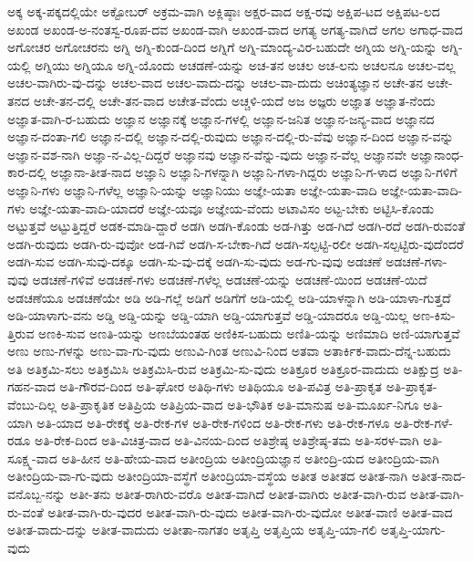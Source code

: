 {ಅಕ್ಕ
ಅಕ್ಕ-ಪಕ್ಕದಲ್ಲಿಯೇ
ಅಕ್ಟೋಬರ್
ಅಕ್ರಮ-ವಾಗಿ
ಅಕ್ಲಿಷ್ಠಾಃ
ಅಕ್ಷರ-ವಾದ
ಅಕ್ಷ-ರವು
ಅಕ್ಷಿಪ-ಟದ
ಅಕ್ಷಿಪಟ-ಲದ
ಅಖಂಡ
ಅಖಂಡ-ಅ-ನಂತಸ್ವ-ರೂಪ-ದವ
ಅಖಂಡ-ವಾಗಿ
ಅಖಂಡ-ವಾದ
ಅಗತ್ಯ
ಅಗತ್ಯ-ವಾಗಿದೆ
ಅಗಲ
ಅಗಾಧ-ವಾದ
ಅಗೋಚರ
ಅಗೋಚರನು
ಅಗ್ನಿ
ಅಗ್ನಿ-ಕುಂಡ-ದಿಂದ
ಅಗ್ನಿಗೆ
ಅಗ್ನಿ-ಮಾಂದ್ಯ-ವಿರ-ಬಹುದೇ
ಅಗ್ನಿಯ
ಅಗ್ನಿ-ಯನ್ನು
ಅಗ್ನಿ-ಯಲ್ಲಿ
ಅಗ್ನಿಯು
ಅಗ್ನಿಯೂ
ಅಗ್ನಿ-ಯೊಂದು
ಅಚಡಣೆ-ಯನ್ನು
ಅಚ-ತನ
ಅಚಲ
ಅಚ-ಲನು
ಅಚಲನೂ
ಅಚಲ-ವಲ್ಲ
ಅಚಲ-ವಾಗಿರು-ವು-ದನ್ನು
ಅಚಲ-ವಾದ
ಅಚಲ-ವಾದು-ದನ್ನು
ಅಚಲ-ವಾ-ದುದು
ಅಚಿಂತ್ಯಜ್ಞಾನ
ಅಚೇ-ತನ
ಅಚೇ-ತನದ
ಅಚೇ-ತನ-ದಲ್ಲಿ
ಅಚೇ-ತನ-ವಾದ
ಅಚೇತ-ವೆಂದು
ಅಚ್ಚಳಿ-ಯದೆ
ಅಜ
ಅಜ್ಞರು
ಅಜ್ಞಾತ
ಅಜ್ಞಾತ-ನೆಂದು
ಅಜ್ಞಾತ-ವಾಗಿ-ರ-ಬಹುದು
ಅಜ್ಞಾನ
ಅಜ್ಞಾನಕ್ಕೆ
ಅಜ್ಞಾನ-ಗಳಲ್ಲಿ
ಅಜ್ಞಾನ-ಜನಿತ
ಅಜ್ಞಾನ-ಜನ್ಯ-ವಾದ
ಅಜ್ಞಾನದ
ಅಜ್ಞಾನ-ದಂತಾ-ಗಲಿ
ಅಜ್ಞಾನ-ದಲ್ಲಿ
ಅಜ್ಞಾನ-ದಲ್ಲಿ-ರುವುದು
ಅಜ್ಞಾನ-ದಲ್ಲಿ-ರು-ವೆವು
ಅಜ್ಞಾನ-ದಿಂದ
ಅಜ್ಞಾನ-ವನ್ನು
ಅಜ್ಞಾನ-ವಶ-ನಾಗಿ
ಅಜ್ಞಾ-ನ-ವಿಲ್ಲ-ದಿದ್ದರೆ
ಅಜ್ಞಾನವು
ಅಜ್ಞಾನ-ವೆನ್ನು-ವುದು
ಅಜ್ಞಾನ-ವೆಲ್ಲ
ಅಜ್ಞಾನವೇ
ಅಜ್ಞಾನಾಂಧ-ಕಾರ-ದಲ್ಲಿ
ಅಜ್ಞಾನಾ-ತೀತ-ನಾದ
ಅಜ್ಞಾನಿ
ಅಜ್ಞಾನಿ-ಗಳನ್ನಾಗಿ
ಅಜ್ಞಾನಿ-ಗಳಾ-ಗಿದ್ದರು
ಅಜ್ಞಾನಿ-ಗ-ಳಾದ
ಅಜ್ಞಾನಿ-ಗಳಿಗೆ
ಅಜ್ಞಾನಿ-ಗಳು
ಅಜ್ಞಾನಿ-ಗಳೆಲ್ಲ
ಅಜ್ಞಾನಿ-ಯನ್ನು
ಅಜ್ಞಾನಿಯು
ಅಜ್ಞೇ-ಯತಾ
ಅಜ್ಞೇ-ಯತಾ-ವಾದಿ
ಅಜ್ಞೇ-ಯತಾ-ವಾದಿ-ಗಳು
ಅಜ್ಞೇ-ಯತಾ-ವಾದಿ-ಯಾದರೆ
ಅಜ್ಞೇ-ಯವೂ
ಅಜ್ಞೇಯ-ವೆಂದು
ಅಟಾವಿಸಂ
ಅಟ್ಟ-ಬೇಕು
ಅಟ್ಟಿಸಿ-ಕೊಂಡು
ಅಟ್ಟುತ್ತವೆ
ಅಟ್ಟುತ್ತಿದ್ದರೆ
ಅಡಕ-ಮಾಡಿ-ದ್ದಾರೆ
ಅಡಗಿ
ಅಡಗಿ-ಕೊಂಡು
ಅಡ-ಗಿತ್ತು
ಅಡ-ಗಿದೆ
ಅಡಗಿ-ರದೆ
ಅಡಗಿ-ರುವಂತೆ
ಅಡಗಿ-ರುವುದು
ಅಡಗಿ-ರು-ವುವೋ
ಅಡ-ಗಿವೆ
ಅಡಗಿ-ಸ-ಬೇಕಾ-ಗಿದೆ
ಅಡಗಿ-ಸಲ್ಪಟ್ಟಿ-ರಲೀ
ಅಡಗಿ-ಸಲ್ಪಟ್ಟಿರು-ವುದೆಂದರೆ
ಅಡಗಿ-ಸುವ
ಅಡಗಿ-ಸುವು-ದಕ್ಕೂ
ಅಡಗಿ-ಸು-ವು-ದಕ್ಕೆ
ಅಡಗಿ-ಸು-ವುದು
ಅಡ-ಗು-ವುವು
ಅಡಚಣೆ
ಅಡಚಣೆ-ಗಳಾ-ವುವು
ಅಡಚಣೆ-ಗಳಿವೆ
ಅಡಚಣೆ-ಗಳು
ಅಡಚಣೆ-ಗಳೆಲ್ಲ
ಅಡಚಣೆ-ಯನ್ನು
ಅಡಚಣೆ-ಯಿಂದ
ಅಡಚಣೆ-ಯಿದೆ
ಅಡಚಣೆಯೂ
ಅಡಚಣೆಯೇ
ಅಡಿ
ಅಡಿ-ಗಲ್ಲೆ
ಅಡಿಗೆ
ಅಡಿಗೆಗೆ
ಅಡಿ-ಯಲ್ಲಿ
ಅಡಿ-ಯಾಳನ್ನಾಗಿ
ಅಡಿ-ಯಾಳಾ-ಗುತ್ತದೆ
ಅಡಿ-ಯಾಳಾಗು-ವನು
ಅಡ್ಡಿ
ಅಡ್ಡಿ-ಯನ್ನು
ಅಡ್ಡಿ-ಯಾಗಿ
ಅಡ್ಡಿ-ಯಾಗುತ್ತವೆ
ಅಡ್ಡಿ-ಯಾದರೂ
ಅಡ್ಡಿ-ಯಿಲ್ಲ
ಅಣ-ಕಿಸು-ತ್ತಿರುವ
ಅಣಕಿ-ಸುವ
ಅಣತಿ-ಯನ್ನು
ಅಣಬೆಯಂತಹ
ಅಣಿಕಿಸ-ಬಹುದು
ಅಣಿತಿ-ಯನ್ನು
ಅಣಿಮಾದಿ
ಅಣಿ-ಯಾಗುತ್ತವೆ
ಅಣು
ಅಣು-ಗಳನ್ನು
ಅಣು-ವಾ-ಗು-ವುದು
ಅಣುವಿ-ಗಿಂತ
ಅಣುವಿ-ನಿಂದ
ಅತವಾ
ಅತಾರ್ಕಿಕ-ವಾದು-ದೆನ್ನ-ಬಹುದು
ಅತಿ
ಅತಿಕ್ರಮಿ-ಸಲು
ಅತಿಕ್ರಮಿಸಿ
ಅತಿಕ್ರಮಿಸಿ-ರುವ
ಅತಿಕ್ರಮಿ-ಸು-ವುದು
ಅತಿಕ್ರೂರ
ಅತಿಕ್ರೂರ-ವಾದುದು
ಅತಿಕ್ಷುದ್ರ
ಅತಿ-ಗಹನ-ವಾದ
ಅತಿ-ಗೌರವ-ದಿಂದ
ಅತಿ-ಘೋರ
ಅತಿಥಿ-ಗಳು
ಅತಿಥಿಯೂ
ಅತಿ-ಪವಿತ್ರ
ಅತಿ-ಪ್ರಾಕೃತ
ಅತಿ-ಪ್ರಾಕೃತ-ವೆಂಬು-ದಿಲ್ಲ
ಅತಿ-ಪ್ರಾಕೃತಿಕ
ಅತಿಪ್ರಿಯ
ಅತಿಪ್ರಿಯ-ವಾದ
ಅತಿ-ಭೌತಿಕ
ಅತಿ-ಮಾನುಷ
ಅತಿ-ಮೂರ್ಖ-ನಿಗೂ
ಅತಿ-ಯಾಗಿ
ಅತಿ-ಯಾದ
ಅತಿ-ರೇಕಕ್ಕೆ
ಅತಿ-ರೇಕ-ಗಳ
ಅತಿ-ರೇಕ-ಗಳಿಂದ
ಅತಿ-ರೇಕ-ಗಳು
ಅತಿ-ರೇಕ-ಗಳೂ
ಅತಿ-ರೇಕ-ಗಳೆ-ರಡೂ
ಅತಿ-ರೇಕ-ದಿಂದ
ಅತಿ-ವಿಚಿತ್ರ-ವಾದ
ಅತಿ-ವಿನಯ-ದಿಂದ
ಅತಿಶ್ರೇಷ್ಠ
ಅತಿಶ್ರೇಷ್ಠ-ತಮ
ಅತಿ-ಸರಳ-ವಾಗಿ
ಅತಿ-ಸೂಕ್ಷ್ಮ-ವಾದ
ಅತಿ-ಹೀನ
ಅತಿ-ಹೇಯ-ವಾದ
ಅತೀಂದ್ರಿಯ
ಅತೀಂದ್ರಿಯಜ್ಞಾನ
ಅತೀಂದ್ರಿ-ಯದ
ಅತೀಂದ್ರಿಯ-ವಾಗಿ
ಅತೀಂದ್ರಿಯ-ವಾ-ಗು-ವುದು
ಅತೀಂದ್ರಿಯಾ-ವಸ್ಥೆಗೆ
ಅತೀಂದ್ರಿಯಾ-ವಸ್ಥೆಯ
ಅತೀತ
ಅತೀತದ
ಅತೀತ-ನಾಗಿ
ಅತೀತ-ನಾದ-ವನೊಬ್ಬ-ನನ್ನು
ಅತೀ-ತನು
ಅತೀತ-ರಾಗಿರು-ವರೊ
ಅತೀತ-ವಾಗಿದೆ
ಅತೀತ-ವಾಗಿರು
ಅತೀತ-ವಾಗಿ-ರುವ
ಅತೀತ-ವಾಗಿ-ರು-ವಂತೆ
ಅತೀತ-ವಾಗಿ-ರು-ವುದರ
ಅತೀತ-ವಾಗಿ-ರು-ವುದು
ಅತೀತ-ವಾಗಿ-ರು-ವುದೋ
ಅತೀತ-ವಾಣಿ
ಅತೀತ-ವಾದ
ಅತೀತ-ವಾದು-ದನ್ನು
ಅತೀತ-ವಾದುದು
ಅತೀತಾ-ನಾಗತಂ
ಅತೃಪ್ತಿ
ಅತೃಪ್ತಿಯ
ಅತೃಪ್ತಿ-ಯಾ-ಗಲಿ
ಅತೃಪ್ತಿ-ಯಾಗು-ವುದು
}
